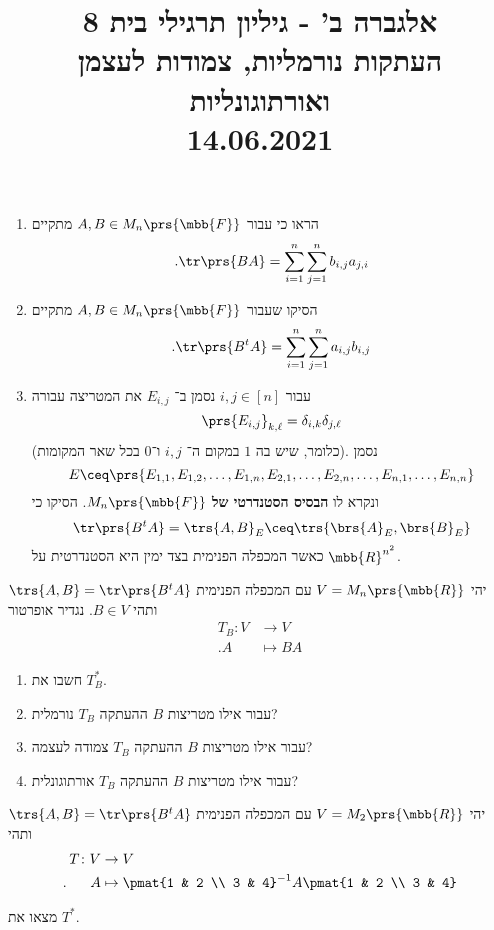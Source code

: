 \documentclass[a4paper,10pt,twoside,openany]{article}
\title{
אלגברה ב' - גיליון תרגילי בית 8 \\
העתקות נורמליות, צמודות לעצמן ואורתוגונליות
\\
\small{14.06.2021}
}
\date{}
\renewcommand{\emph}[1]{\textbf{#1}}
\begin{document}
\maketitle

\begin{exercise}%
\begin{enumerate}
\item הראו כי עבור
$A,B \in M_n\prs{\mbb{F}}$
מתקיים
\[\text{.} \tr\prs{BA} = \sum_{i=1}^n \sum_{j=1}^n b_{i,j} a_{j,i}\]
\item הסיקו שעבור
$A,B \in M_n\prs{\mbb{F}}$
מתקיים
\[\text{.} \tr\prs{B^t A} = \sum_{i=1}^n \sum_{j=1}^n a_{i,j} b_{i,j}\]
\item עבור
$i,j \in [n]$
נסמן ב־%
$E_{i,j}$
את המטריצה עבורה
\[\prs{E_{i,j}}_{k,\ell} = \delta_{i,k} \delta_{j,\ell}\]
(כלומר, שיש בה $1$ במקום ה־%
$i,j$
ו־$0$ בכל שאר המקומות).
נסמן
\[E \ceq \prs{E_{1,1}, E_{1,2}, \ldots, E_{1,n}, E_{2,1}, \ldots, E_{2,n}, \ldots, E_{n,1}, \ldots, E_{n,n}}\]
ונקרא לו
\emph{הבסיס הסטנדרטי של
$M_n\prs{\mbb{F}}$}.
הסיקו כי
\[\tr\prs{B^t A} = \trs{A,B}_E \ceq \trs{\brs{A}_E, \brs{B}_E}\]
כאשר המכפלה הפנימית בצד ימין היא הסטנדרטית על
$\mbb{R}^{n^2}$.
\end{enumerate}
\end{exercise}

\begin{exercise}%
יהי
$V = M_n\prs{\mbb{R}}$
עם המכפלה הפנימית
$\trs{A,B} = \tr\prs{B^t A}$
ותהי
$B \in V$.
נגדיר אופרטור
\begin{align*}
T_B \colon V &\to V \\
\text{.} A &\mapsto BA
\end{align*}
\begin{enumerate}
\item חשבו את
$T_B^*$.
\item עבור אילו מטריצות
$B$
ההעתקה
$T_B$
נורמלית?
\item עבור אילו מטריצות
$B$
ההעתקה
$T_B$
צמודה לעצמה?
\item עבור אילו מטריצות
$B$
ההעתקה
$T_B$
אורתוגונלית?
\end{enumerate}
\end{exercise}

\begin{exercise}%
יהי
$V = M_2\prs{\mbb{R}}$
עם המכפלה הפנימית
$\trs{A,B} = \tr\prs{B^t A}$
ותהי
\begin{align*}
T \colon V &\to V \\
\text{.} \hphantom{lala} A &\mapsto \pmat{1 & 2 \\ 3 & 4}^{-1} A \pmat{1 & 2 \\ 3 & 4}
\end{align*}

מצאו את
$T^*$.
\end{exercise}
\end{document}
